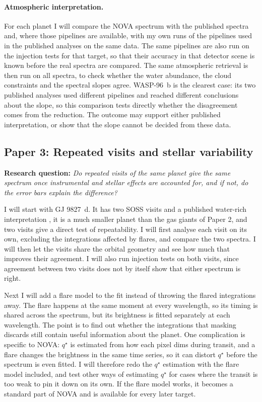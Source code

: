 \paragraph{Atmospheric interpretation.}
For each planet I will compare the NOVA spectrum with the published
spectra and, where those pipelines are available, with my own runs of the
pipelines used in the published analyses on the same data. The same
pipelines are also run on the injection tests for that target, so that
their accuracy in that detector scene is known before the real spectra
are compared. The same atmospheric retrieval is then run on all spectra,
to check whether the water abundance, the cloud constraints and the
spectral slopes agree. WASP-96~b is the clearest case: its two published
analyses used different pipelines and reached different conclusions about
the slope, so this comparison tests directly whether the disagreement
comes from the reduction. The outcome may support either published
interpretation, or show that the slope cannot be decided from these data.

\subsection{Paper 3: Repeated visits and stellar variability}
\label{subsec:fw_repeats}

\noindent\textbf{Research question:} \textit{Do repeated visits of the
same planet give the same spectrum once instrumental and stellar effects
are accounted for, and if not, do the error bars explain the difference?}

I will start with GJ 9827~d. It has two SOSS visits and a published
water-rich interpretation \citep{PiauletGhorayebEtAl2024}, it is a much
smaller planet than the gas giants of Paper 2, and two visits give a
direct test of repeatability. I will first analyse each visit on its own,
excluding the integrations affected by flares, and compare the two
spectra. I will then let the visits share the orbital geometry and see how
much that improves their agreement. I will also run injection tests on
both visits, since agreement between two visits does not by itself show
that either spectrum is right.

Next I will add a flare model to the fit instead of throwing the flared
integrations away. The flare happens at the same moment at every
wavelength, so its timing is shared across the spectrum, but its
brightness is fitted separately at each wavelength. The point is to find
out whether the integrations that masking discards still contain useful
information about the planet. One complication is specific to NOVA:
$q^\star$ is estimated from how each pixel dims during transit, and a
flare changes the brightness in the same time series, so it can distort
$q^\star$ before the spectrum is even fitted. I will therefore redo the
$q^\star$ estimation with the flare model included, and test other ways of
estimating $q^\star$ for cases where the transit is too weak to pin it
down on its own. If the flare model works, it becomes a standard part of
NOVA and is available for every later target.

